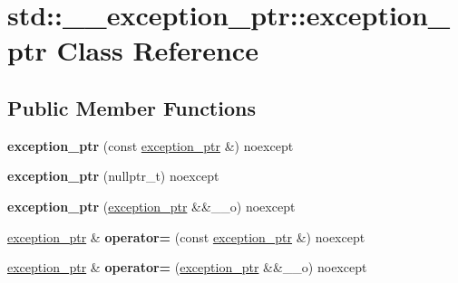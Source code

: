 \hypertarget{classstd_1_1____exception__ptr_1_1exception__ptr}{\section{std\+:\+:\+\_\+\+\_\+exception\+\_\+ptr\+:\+:exception\+\_\+ptr Class Reference}
\label{classstd_1_1____exception__ptr_1_1exception__ptr}
}
\subsection*{Public Member Functions}
\begin{DoxyCompactItemize}
\item 
\hypertarget{classstd_1_1____exception__ptr_1_1exception__ptr_a145c306627582b1267de080d7ed397bf}{{\bfseries exception\+\_\+ptr} (const \hyperlink{classstd_1_1____exception__ptr_1_1exception__ptr}{exception\+\_\+ptr} \&) noexcept}\label{classstd_1_1____exception__ptr_1_1exception__ptr_a145c306627582b1267de080d7ed397bf}

\item 
\hypertarget{classstd_1_1____exception__ptr_1_1exception__ptr_af9793421da4a90faafedbf20d77cbf3b}{{\bfseries exception\+\_\+ptr} (nullptr\+\_\+t) noexcept}\label{classstd_1_1____exception__ptr_1_1exception__ptr_af9793421da4a90faafedbf20d77cbf3b}

\item 
\hypertarget{classstd_1_1____exception__ptr_1_1exception__ptr_a482e4689f9f3dac849c15b849603a399}{{\bfseries exception\+\_\+ptr} (\hyperlink{classstd_1_1____exception__ptr_1_1exception__ptr}{exception\+\_\+ptr} \&\&\+\_\+\+\_\+o) noexcept}\label{classstd_1_1____exception__ptr_1_1exception__ptr_a482e4689f9f3dac849c15b849603a399}

\item 
\hypertarget{classstd_1_1____exception__ptr_1_1exception__ptr_ad65245e1b195812da895d36dbac98829}{\hyperlink{classstd_1_1____exception__ptr_1_1exception__ptr}{exception\+\_\+ptr} \& {\bfseries operator=} (const \hyperlink{classstd_1_1____exception__ptr_1_1exception__ptr}{exception\+\_\+ptr} \&) noexcept}\label{classstd_1_1____exception__ptr_1_1exception__ptr_ad65245e1b195812da895d36dbac98829}

\item 
\hypertarget{classstd_1_1____exception__ptr_1_1exception__ptr_a8c004ec7c8a711d3a42c97fbe569e3da}{\hyperlink{classstd_1_1____exception__ptr_1_1exception__ptr}{exception\+\_\+ptr} \& {\bfseries operator=} (\hyperlink{classstd_1_1____exception__ptr_1_1exception__ptr}{exception\+\_\+ptr} \&\&\+\_\+\+\_\+o) noexcept}\label{classstd_1_1____exception__ptr_1_1exception__ptr_a8c004ec7c8a711d3a42c97fbe569e3da}


\end{DoxyCompactItemize}
